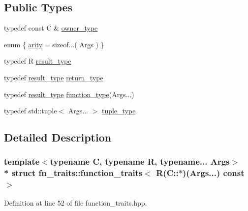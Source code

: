 \subsection*{Public Types}
\begin{DoxyCompactItemize}
\item 
typedef const C \& \hyperlink{structfn__traits_1_1function__traits_3_01_r_07_c_1_1_5_08_07_args_8_8_8_08_01const_01_01_4_af861070a9fa7ecbcc812135e16232e9a}{owner\+\_\+type}
\item 
enum \{ \hyperlink{structfn__traits_1_1function__traits_3_01_r_07_args_8_8_8_08_4_aafde9521d9646c97b984646d8273dd3ba2f612b5524050ab8d6ab3d54d52dbbb0}{arity} = sizeof...( Args )
 \}
\item 
typedef R \hyperlink{structfn__traits_1_1function__traits_3_01_r_07_args_8_8_8_08_4_a1b509243ed1b4707465625de10e6c6bb}{result\+\_\+type}
\item 
typedef \hyperlink{structfn__traits_1_1function__traits_3_01_r_07_args_8_8_8_08_4_a1b509243ed1b4707465625de10e6c6bb}{result\+\_\+type} \hyperlink{structfn__traits_1_1function__traits_3_01_r_07_args_8_8_8_08_4_adf6a35a9b703dfb4778e59f132e00a9b}{return\+\_\+type}
\item 
typedef \hyperlink{structfn__traits_1_1function__traits_3_01_r_07_args_8_8_8_08_4_a1b509243ed1b4707465625de10e6c6bb}{result\+\_\+type} \hyperlink{structfn__traits_1_1function__traits_3_01_r_07_args_8_8_8_08_4_a85e5883a1c8050fe442c1072386b2d11}{function\+\_\+type}(Args...)
\item 
typedef std\+::tuple$<$ Args... $>$ \hyperlink{structfn__traits_1_1function__traits_3_01_r_07_args_8_8_8_08_4_a9b60ae8c79e52addf352e4ae7c8077b4}{tuple\+\_\+type}
\end{DoxyCompactItemize}


\subsection{Detailed Description}
\subsubsection*{template$<$typename C, typename R, typename... Args$>$\\*
struct fn\+\_\+traits\+::function\+\_\+traits$<$ R(\+C\+::$\ast$)(\+Args...) const  $>$}



Definition at line 52 of file function\+\_\+traits.\+hpp.



